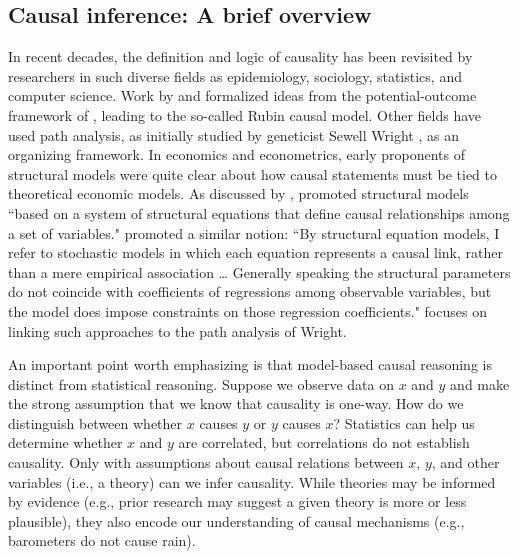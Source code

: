 \documentclass[12pt,reqno,titlepage]{amsart}
\begin{document}
\begin{doublespace}

\subsection{Causal inference: A brief overview}
In recent decades, the definition and logic of causality has been revisited by researchers in such diverse fields as epidemiology, sociology, statistics, and computer science. 
Work by \citet{Rubin:1974im,Rubin:1977dv} and \citet{Holland:1986p7458} formalized ideas from the potential-outcome framework of \citet{Neyman:1923aa}, leading to the so-called Rubin causal model. 
Other fields have used path analysis, as initially studied by geneticist Sewell Wright \citep{Wright:1921aa}, as an organizing framework.
In economics and econometrics, early proponents of structural models were quite clear about how causal statements must be tied to theoretical economic models.
As discussed by \citet{Heckman:2015ez}, \citet{Haavelmo:1943cl,Haavelmo:1944jq} promoted structural models ``based on a system of structural equations that define causal relationships among a set of variables."
\citet[p.\,979]{Goldberger:1972cq} promoted a similar notion: 
``By structural equation models, I refer to stochastic models in which each equation represents a causal link, rather than a mere empirical association \dots
Generally speaking the structural parameters do not coincide with coefficients of regressions among observable variables, but the model does impose constraints on those regression coefficients."
\citet{Goldberger:1972cq} focuses on linking such approaches to the path analysis of Wright.

An important point worth emphasizing is that model-based causal reasoning is distinct from statistical reasoning. 
Suppose we observe data on $x$ and $y$ and make the strong assumption that we know that causality is one-way. 
How do we distinguish between whether $x$ causes $y$ or $y$ causes $x$? 
Statistics can help us determine whether $x$ and $y$ are correlated, but correlations do not establish causality.
Only with assumptions about causal relations between $x$, $y$, and other variables (i.e., a theory) can we infer causality.
While theories may be informed by evidence (e.g., prior research may suggest a given theory is more or less plausible), they also encode our understanding of causal mechanisms (e.g., barometers do not cause rain).


\end{doublespace}
\end{document}
